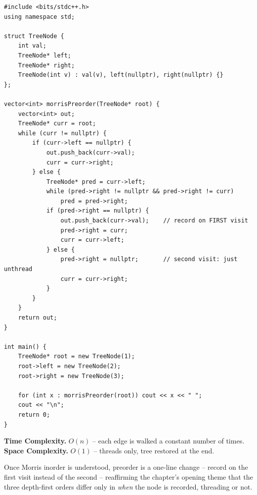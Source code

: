 \begin{lstlisting}
#include <bits/stdc++.h>
using namespace std;

struct TreeNode {
    int val;
    TreeNode* left;
    TreeNode* right;
    TreeNode(int v) : val(v), left(nullptr), right(nullptr) {}
};

vector<int> morrisPreorder(TreeNode* root) {
    vector<int> out;
    TreeNode* curr = root;
    while (curr != nullptr) {
        if (curr->left == nullptr) {
            out.push_back(curr->val);
            curr = curr->right;
        } else {
            TreeNode* pred = curr->left;
            while (pred->right != nullptr && pred->right != curr)
                pred = pred->right;
            if (pred->right == nullptr) {
                out.push_back(curr->val);    // record on FIRST visit
                pred->right = curr;
                curr = curr->left;
            } else {
                pred->right = nullptr;       // second visit: just unthread
                curr = curr->right;
            }
        }
    }
    return out;
}

int main() {
    TreeNode* root = new TreeNode(1);
    root->left = new TreeNode(2);
    root->right = new TreeNode(3);

    for (int x : morrisPreorder(root)) cout << x << " ";
    cout << "\n";
    return 0;
}
\end{lstlisting}

\begin{complexitybox}
\textbf{Time Complexity.} $O(n)$ -- each edge is walked a constant number
of times. \textbf{Space Complexity.} $O(1)$ -- threads only, tree restored
at the end.
\end{complexitybox}

\begin{takeawaybox}
Once Morris inorder is understood, preorder is a one-line change -- record
on the first visit instead of the second -- reaffirming the chapter's
opening theme that the three depth-first orders differ only in \emph{when}
the node is recorded, threading or not.
\end{takeawaybox}
